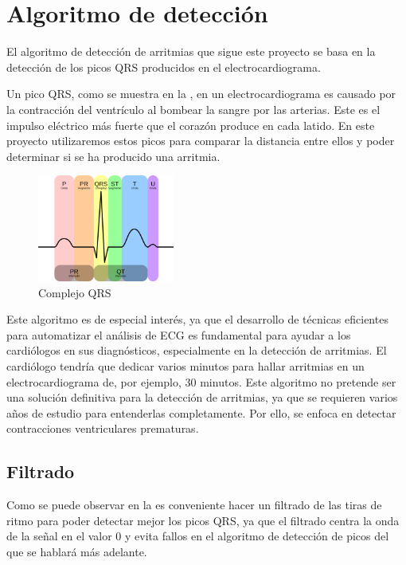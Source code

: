 \section{Algoritmo de detección}
El algoritmo de detección de arritmias que sigue este proyecto se basa en la detección de 
los picos QRS producidos en el electrocardiograma.

Un pico QRS, como se muestra en la , en un electrocardiograma es causado por la contracción del ventrículo al bombear la sangre por las arterias. Este es el impulso eléctrico más fuerte que el corazón produce en cada latido\cite{wiki:QRS_complex}. En este proyecto utilizaremos estos picos para comparar la distancia entre ellos y poder determinar si se ha producido una arritmia. 

\begin{figure}[h]
	\centering
	\includegraphics[width=0.4\textwidth]{./Images/img_introduccion/complejoQRS.png}
	\caption[Complejo QRS]{Complejo QRS \cite{desai2021low}}
	\label{fig:complejoQRS}
\end{figure}

Este algoritmo es de especial interés\cite{kiranyaz2011personalized}, ya que el desarrollo de técnicas eficientes para automatizar el análisis de ECG es fundamental para ayudar a los cardiólogos en sus diagnósticos, especialmente en la detección de arritmias. El cardiólogo tendría que dedicar varios minutos para hallar arritmias en un electrocardiograma de, por ejemplo, 30 minutos. Este algoritmo no pretende ser una solución definitiva para la detección de arritmias, ya que se requieren varios años de estudio para entenderlas completamente. Por ello, se enfoca en detectar contracciones ventriculares prematuras.

\subsection{Filtrado}
Como se puede observar en la  es conveniente hacer un filtrado de las tiras de ritmo para poder detectar mejor los picos QRS, ya que el filtrado centra la onda de la señal en el valor 0 y evita fallos en el algoritmo de detección de picos del que se hablará más adelante. 

